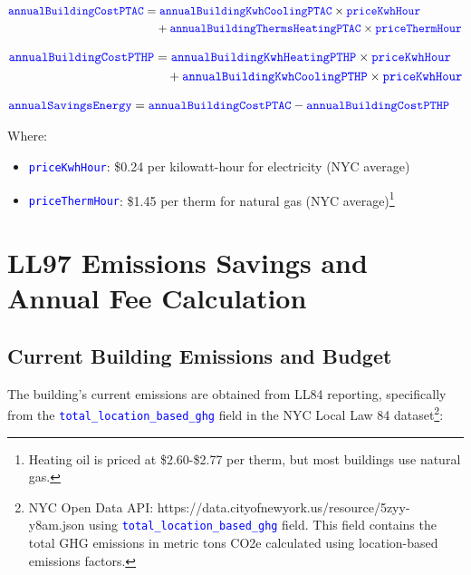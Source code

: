 \documentclass{article}
\newcommand{\code}[1]{\textcolor{blue}{\texttt{#1}}}
\begin{document}
\begin{align}
\code{annualBuildingCostPTAC} &= \code{annualBuildingKwhCoolingPTAC} \times \code{priceKwhHour} \nonumber \\
&\quad + \code{annualBuildingThermsHeatingPTAC} \times \code{priceThermHour}
\end{align}

\begin{align}
\code{annualBuildingCostPTHP} &= \code{annualBuildingKwhHeatingPTHP} \times \code{priceKwhHour} \nonumber \\
&\quad + \code{annualBuildingKwhCoolingPTHP} \times \code{priceKwhHour}
\end{align}

\begin{align}
\code{annualSavingsEnergy} &= \code{annualBuildingCostPTAC} - \code{annualBuildingCostPTHP}
\end{align}

Where:
\begin{itemize}
    \item \code{priceKwhHour}: \$0.24 per kilowatt-hour for electricity (NYC average)
    \item \code{priceThermHour}: \$1.45 per therm for natural gas (NYC average)\footnote{Heating oil is priced at \$2.60-\$2.77 per therm, but most buildings use natural gas.}
\end{itemize}

\section{LL97 Emissions Savings and Annual Fee Calculation}

\vspace{0.3cm}
\noindent{}
\vspace{0.3cm}

\subsection{Current Building Emissions and Budget}

The building's current emissions are obtained from LL84 reporting, specifically from the \code{total\_location\_based\_ghg} field in the NYC Local Law 84 dataset\footnote{NYC Open Data API: https://data.cityofnewyork.us/resource/5zyy-y8am.json using \code{total\_location\_based\_ghg} field. This field contains the total GHG emissions in metric tons CO2e calculated using location-based emissions factors.}:
\end{document}
